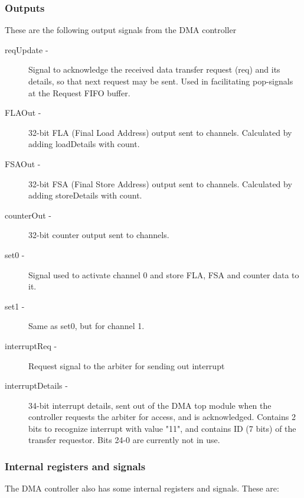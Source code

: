 \begin{appendix}
\subsubsection{Outputs}
These are the following output signals from the DMA controller

\begin{description}
    \item [reqUpdate -]
    Signal to acknowledge the received data transfer request (req) and its details, so that next request may be sent.
    Used in facilitating pop-signals at the Request FIFO buffer.
    \item[FLAOut -]
    32-bit FLA (Final Load Address) output sent to channels.
    Calculated by adding loadDetails with count.
    \item[FSAOut -]
    32-bit FSA (Final Store Address) output sent to channels.
    Calculated by adding storeDetails with count.
    \item[counterOut -]
    32-bit counter output sent to channels.
    \item[set0 -]
    Signal used to activate channel 0 and store FLA, FSA and counter data to it.
    \item[set1 -]
    Same as set0, but for channel 1.
    \item[interruptReq -]
    Request signal to the arbiter for sending out interrupt
    \item[interruptDetails -]
    34-bit interrupt details, sent out of the DMA top module when the controller requests the arbiter for access, and is acknowledged.
    Contains 2 bits to recognize interrupt with value "11", and contains ID (7 bits) of the transfer requestor.
    Bits 24-0 are currently not in use.
\end{description}

\subsubsection{Internal registers and signals}
The DMA controller also has some internal registers and signals.
These are:


\end{appendix}
